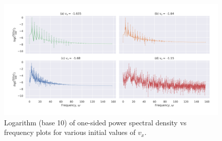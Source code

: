 \documentclass[a4paper]{article}
\begin{document}
		
		\begin{figure}
			\includegraphics[width=\columnwidth]{../task2/plots/q1-5_log.jpg}
			\caption{Logarithm (base 10) of one-sided power spectral density vs frequency plots for various initial values of \(v_x\).}
			\label{fig:task2_log}
		\end{figure}
	
\end{document}

